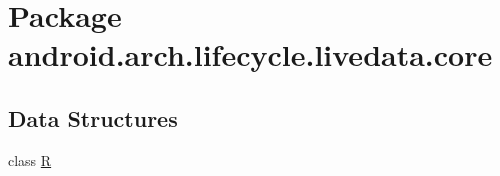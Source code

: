 \hypertarget{namespaceandroid_1_1arch_1_1lifecycle_1_1livedata_1_1core}{}\section{Package android.\+arch.\+lifecycle.\+livedata.\+core}
\label{namespaceandroid_1_1arch_1_1lifecycle_1_1livedata_1_1core}
\subsection*{Data Structures}
\begin{DoxyCompactItemize}
\item 
class \mbox{\hyperlink{classandroid_1_1arch_1_1lifecycle_1_1livedata_1_1core_1_1_r}{R}}
\end{DoxyCompactItemize}
